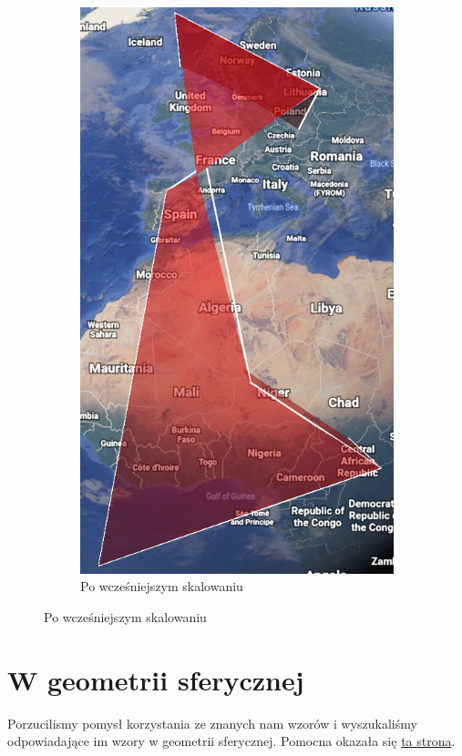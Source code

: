 \begin{figure}[H]
\begin{subfigure}{0.41\textwidth}
        \includegraphics[width=0.9\linewidth]{photos/method2.png}
        \caption{Po wcześniejszym skalowaniu}
    \end{subfigure}
\end{figure}

\section{W geometrii sferycznej}\label{sec:geolocalisation_spherical}

Porzucilismy pomysł korzystania ze znanych nam wzorów i wyszukaliśmy odpowiadające im wzory
w geometrii sferycznej. Pomocna okazała się \href{http://www.movable-type.co.uk/scripts/latlong.html}{ta strona}.

